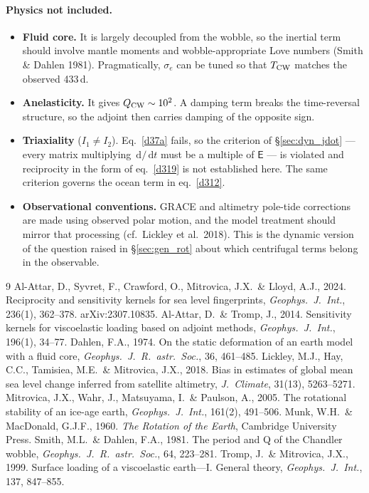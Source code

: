 \documentclass[11pt,a4paper]{article}
\newcommand{\E}{\mathsf{E}}
\newcommand{\dd}{\,\mathrm{d}}
\begin{document}
\paragraph{Physics not included.}
\begin{itemize}
  \item \textbf{Fluid core.} It is largely decoupled from the wobble, so the inertial term should
  involve mantle moments and wobble-appropriate Love numbers (Smith \& Dahlen 1981). Pragmatically,
  $\sigma_e$ can be tuned so that $T_{\rm CW}$ matches the observed 433\,d.
  \item \textbf{Anelasticity.} It gives $Q_{\rm CW}\sim10^2$. A damping term breaks the
  time-reversal structure, so the adjoint then carries damping of the opposite sign.
  \item \textbf{Triaxiality} ($I_1\neq I_2$). Eq.~\eqref{d37a} fails, so the criterion of
  \S\ref{sec:dyn_jdot} --- every matrix multiplying $\dd/\dd t$ must be a multiple of $\E$ --- is
  violated and reciprocity in the form of eq.~\eqref{d319} is not established here. The same
  criterion governs the ocean term in eq.~\eqref{d312}.
  \item \textbf{Observational conventions.} GRACE and altimetry pole-tide corrections are made using
  observed polar motion, and the model treatment should mirror that processing (cf.\ Lickley et al.\
  2018). This is the dynamic version of the question raised in \S\ref{sec:gen_rot} about which
  centrifugal terms belong in the observable.
\end{itemize}

\begin{thebibliography}{9}
 Al-Attar, D., Syvret, F., Crawford, O., Mitrovica, J.X.\ \& Lloyd, A.J., 2024. Reciprocity and sensitivity kernels for sea level fingerprints, \emph{Geophys.\ J.\ Int.}, 236(1), 362--378. arXiv:2307.10835.
\bibitem{at14} Al-Attar, D.\ \& Tromp, J., 2014. Sensitivity kernels for viscoelastic loading based on adjoint methods, \emph{Geophys.\ J.\ Int.}, 196(1), 34--77.
\bibitem{dahlen74} Dahlen, F.A., 1974. On the static deformation of an earth model with a fluid core, \emph{Geophys.\ J.\ R.\ astr.\ Soc.}, 36, 461--485.
\bibitem{lickley} Lickley, M.J., Hay, C.C., Tamisiea, M.E.\ \& Mitrovica, J.X., 2018. Bias in estimates of global mean sea level change inferred from satellite altimetry, \emph{J.\ Climate}, 31(13), 5263--5271.
\bibitem{mitrovica05} Mitrovica, J.X., Wahr, J., Matsuyama, I.\ \& Paulson, A., 2005. The rotational stability of an ice-age earth, \emph{Geophys.\ J.\ Int.}, 161(2), 491--506.
\bibitem{munk} Munk, W.H.\ \& MacDonald, G.J.F., 1960. \emph{The Rotation of the Earth}, Cambridge University Press.
\bibitem{sd81} Smith, M.L.\ \& Dahlen, F.A., 1981. The period and Q of the Chandler wobble, \emph{Geophys.\ J.\ R.\ astr.\ Soc.}, 64, 223--281.
\bibitem{tm99} Tromp, J.\ \& Mitrovica, J.X., 1999. Surface loading of a viscoelastic earth---I. General theory, \emph{Geophys.\ J.\ Int.}, 137, 847--855.
\end{thebibliography}
\end{document}
